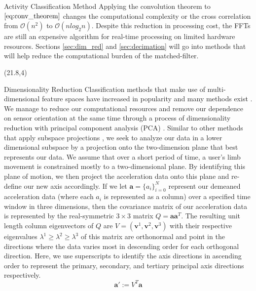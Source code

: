 \documentclass[unknownkeysallowed,final]{beamer}
\begin{document}
\begin{frame}{}
\begin{textblock}{19.5}
\begin{block}{\small{Activity Classification Method}}
Applying the convolution theorem to $\eqref{eq:conv_theorem}$ changes the computational complexity or the cross correlation from $\mathcal{O}(n^2)$ to $\mathcal{O}(n log_2n)$.
Despite this reduction in processing cost, the FFTs are still an expensive algorithm for real-time processing on limited hardware resources.
Sections \ref{sec:dim_red} and \ref{sec:decimation} will go into methods that will help reduce the computational burden of the matched-filter.
\end{block}
\end{textblock}

\begin{textblock}{18}(21.8,4)

\begin{block}{\small{Dimensionality Reduction}}
Classification methods that make use of multi-dimensional feature spaces have increased in popularity and many methods exist \cite{survey_multi_view_machine_learning}.
We manage to reduce our computational resources and remove our dependence on sensor orientation at the same time through a process of dimensionality reduction with principal component analysis (PCA) \cite{bishop_2006}.
Similar to other methods that apply subspace projections \cite{low_rank_subspace}, we seek to analyze our data in a lower dimensional subspace by a projection onto the two-dimension plane that best represents our data.
We assume that over a short period of time, a user's limb movement is constrained mostly to a two-dimensional plane.
By identifying this plane of motion, we then project the acceleration data onto this plane and re-define our new axis accordingly.
%
If we let $\textbf{a} = \{a_i\}_{i=0}^{N}$ represent our demeaned acceleration data (where each $a_i$ is represented as a column) over a specified time window in three dimensions, then the covariance matrix of our acceleration data is represented by the real-symmetric $3 \times 3$ matrix $Q = \textbf{a} \textbf{a}^T$.
The resulting unit length column eigenvectors of $Q$ are $V = (\textbf{v}^1,\textbf{v}^2,\textbf{v}^3)$ with their respective eigenvalues $\lambda^1 \geq \lambda^2 \geq \lambda^3$ of this matrix are orthonormal and point in the directions where the data varies most in descending order for each orthogonal direction.
Here, we use superscripts to identify the axis directions in ascending order to represent the primary, secondary, and tertiary principal axis directions respectively.
%
\begin{equation} \label{eq:project}
   \textbf{a}' := V^T \textbf{a}
\end{equation}

\end{block}
\end{textblock}
\end{frame}
\end{document}
